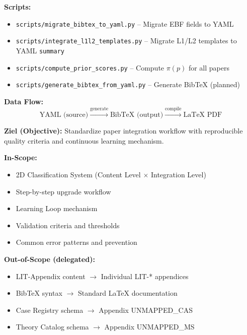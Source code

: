 \begin{tcolorbox}[colback=green!5!white, colframe=green!75!black,
    title=\textbf{SSOT Data Architecture: Paper Database}]
\textbf{Scripts:}
\begin{itemize}[nosep]
    \item \texttt{scripts/migrate\_bibtex\_to\_yaml.py} -- Migrate EBF fields to YAML
    \item \texttt{scripts/integrate\_l1l2\_templates.py} -- Migrate L1/L2 templates to YAML \texttt{summary}
    \item \texttt{scripts/compute\_prior\_scores.py} -- Compute $\pi(p)$ for all papers
    \item \texttt{scripts/generate\_bibtex\_from\_yaml.py} -- Generate BibTeX (planned)
\end{itemize}

\textbf{Data Flow:}
\begin{equation}
\text{YAML (source)} \xrightarrow{\text{generate}} \text{BibTeX (output)} \xrightarrow{\text{compile}} \text{LaTeX PDF}
\end{equation}

\end{tcolorbox}


\begin{tcolorbox}[
    colback=orange!5!white,
    colframe=orange!75!black,
    title={\textbf{Appendix Scope: Ziel / In-Scope / Out-of-Scope}},
    fonttitle=\bfseries
]

\textbf{Ziel (Objective):}
Standardize paper integration workflow with reproducible quality criteria and
continuous learning mechanism.

\vspace{0.3cm}
\textbf{In-Scope:}
\begin{itemize}[nosep]
    \item 2D Classification System (Content Level $\times$ Integration Level)
    \item Step-by-step upgrade workflow
    \item Learning Loop mechanism
    \item Validation criteria and thresholds
    \item Common error patterns and prevention
\end{itemize}

\vspace{0.3cm}
\textbf{Out-of-Scope (delegated):}
\begin{itemize}[nosep]
    \item LIT-Appendix content $\rightarrow$ Individual LIT-* appendices
    \item BibTeX syntax $\rightarrow$ Standard LaTeX documentation
    \item Case Registry schema $\rightarrow$ Appendix UNMAPPED_CAS
    \item Theory Catalog schema $\rightarrow$ Appendix UNMAPPED_MS
\end{itemize}

\end{tcolorbox}

